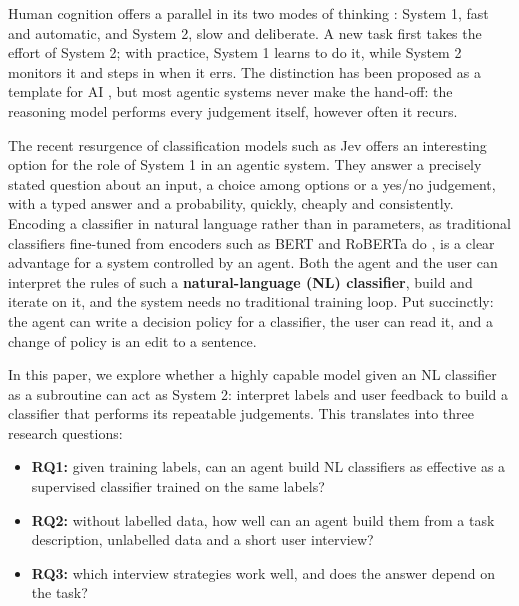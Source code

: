 \documentclass[11pt]{article}
\begin{document}
Human cognition offers a parallel in its two modes of thinking \citep{kahneman2011thinking}: System 1, fast and automatic, and System 2, slow and deliberate. A new task first takes the effort of System 2; with practice, System 1 learns to do it, while System 2 monitors it and steps in when it errs. The distinction has been proposed as a template for AI \citep{bengio2019system2,booch2021thinking}, but most agentic systems never make the hand-off: the reasoning model performs every judgement itself, however often it recurs.

The recent resurgence of classification models such as Jev \citep{typesafe2026} offers an interesting option for the role of System 1 in an agentic system. They answer a precisely stated question about an input, a choice among options or a yes/no judgement, with a typed answer and a probability, quickly, cheaply and consistently. Encoding a classifier in natural language rather than in parameters, as traditional classifiers fine-tuned from encoders such as BERT and RoBERTa do \citep{devlin2019bert,liu2019roberta}, is a clear advantage for a system controlled by an agent. Both the agent and the user can interpret the rules of such a \textbf{natural-language (NL) classifier}, build and iterate on it, and the system needs no traditional training loop. Put succinctly: the agent can write a decision policy for a classifier, the user can read it, and a change of policy is an edit to a sentence.

In this paper, we explore whether a highly capable model given an NL classifier as a subroutine can act as System 2: interpret labels and user feedback to build a classifier that performs its repeatable judgements. This translates into three research questions:

\begin{itemize}
\item \textbf{RQ1:} given training labels, can an agent build NL classifiers as effective as a supervised classifier trained on the same labels?
\item \textbf{RQ2:} without labelled data, how well can an agent build them from a task description, unlabelled data and a short user interview?
\item \textbf{RQ3:} which interview strategies work well, and does the answer depend on the task?
\end{itemize}
\end{document}
